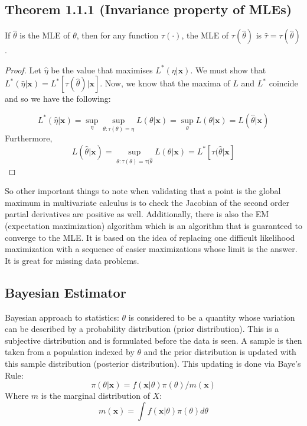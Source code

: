 \documentclass[12pt]{article}
\begin{document}
\subsection*{Theorem 1.1.1 (Invariance property of MLEs)}
If $\hat{\theta}$ is the MLE of $\theta$, then for any function $\tau(\cdot)$, the MLE of $\tau(\hat{\theta})$ is $\hat{\tau} = \tau(\hat{\theta})$.

\begin{proof} Let $\hat{\eta}$ be the value that maximises $L^*(\eta|\mathbf{x})$. We must show that $L^*(\hat{\eta}|\mathbf{x}) = L^*[\tau(\hat{\theta})|\mathbf{x}]$. Now, we know that the maxima of $L$ and $L^*$ coincide and so we have the following:

\[L^*(\hat{\eta}|\mathbf{x}) = \sup_{\eta}\sup_{\theta:\tau(\theta) = \eta} L(\theta|\mathbf{x}) = \sup_\theta L(\theta|\mathbf{x}) = L(\hat{\theta}|\mathbf{x})\]
Furthermore,
\[L(\hat{\theta}|\mathbf{x}) = \sup_{\theta:\tau(\theta) = \tau(\hat{\theta}} L(\theta|\mathbf{x}) = L^*[\tau(\hat{\theta}|\mathbf{x}]\]

\end{proof}
So other important things to note when validating that a point is the global maximum in multivariate calculus is to check the Jacobian of the second order partial derivatives are positive as well. Additionally, there is also the EM (expectation maximization) algorithm which is an algorithm that is guaranteed to converge to the MLE. It is based on the idea of replacing one difficult likelihood maximization with a sequence of easier maximizations whose limit is the answer. It is great for missing data problems. 
\subsection{Bayesian Estimator}
Bayesian approach to statistics: $\theta$ is considered to be a quantity whose variation can be described by a probability distribution (prior distribution). This is a subjective distribution and is formulated before the data is seen. A sample is then taken from a population indexed by $\theta$ and the prior distribution is updated with this sample distribution (posterior distribution). This updating is done via Baye's Rule:
\[\pi(\theta|\mathbf{x}) = f(\mathbf{x}|\theta)\pi(\theta)/m(\mathbf{x})\]
Where $m$ is the marginal distribution of $X$:
\[m(\mathbf{x}) = \int f(\mathbf{x}|\theta) \pi (\theta) d\theta\]
\end{document}
